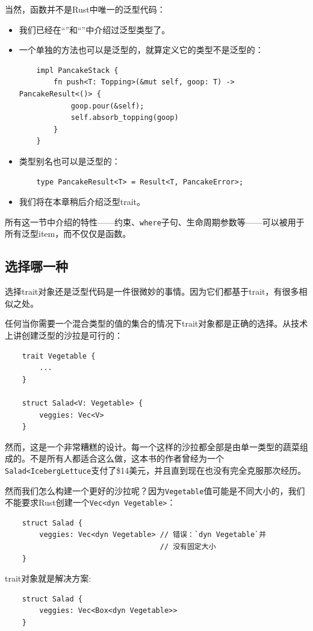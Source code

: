 当然，函数并不是Rust中唯一的泛型代码：
\begin{itemize}
    \item 我们已经在“”和“”中介绍过泛型类型了。
    \item 一个单独的方法也可以是泛型的，就算定义它的类型不是泛型的：
    \begin{verbatim}
    impl PancakeStack {
        fn push<T: Topping>(&mut self, goop: T) -> PancakeResult<()> {
            goop.pour(&self);
            self.absorb_topping(goop)
        }
    }
    \end{verbatim}
    \item 类型别名也可以是泛型的：
    \begin{verbatim}
    type PancakeResult<T> = Result<T, PancakeError>;
    \end{verbatim}
    \item 我们将在本章稍后介绍泛型trait。
\end{itemize}

所有这一节中介绍的特性——约束、\texttt{where}子句、生命周期参数等——可以被用于所有泛型item，而不仅仅是函数。

\subsection{选择哪一种}
选择trait对象还是泛型代码是一件很微妙的事情。因为它们都基于trait，有很多相似之处。

任何当你需要一个混合类型的值的集合的情况下trait对象都是正确的选择。从技术上讲创建泛型的沙拉是可行的：
\begin{verbatim}
    trait Vegetable {
        ...
    }

    struct Salad<V: Vegetable> {
        veggies: Vec<V>
    }
\end{verbatim}

然而，这是一个非常糟糕的设计。每一个这样的沙拉都全部是由单一类型的蔬菜组成的。不是所有人都适合这么做，这本书的作者曾经为一个\texttt{Salad<IcebergLettuce}支付了\$14美元，并且直到现在也没有完全克服那次经历。

然而我们怎么构建一个更好的沙拉呢？因为\texttt{Vegetable}值可能是不同大小的，我们不能要求Rust创建一个\texttt{Vec<dyn Vegetable>}：
\begin{verbatim}
    struct Salad {
        veggies: Vec<dyn Vegetable> // 错误：`dyn Vegetable`并
                                    // 没有固定大小
    }
\end{verbatim}

trait对象就是解决方案:
\begin{verbatim}
    struct Salad {
        veggies: Vec<Box<dyn Vegetable>>
    }
\end{verbatim}


